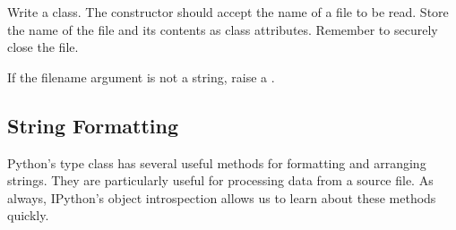 \begin{problem}
Write a  class.
The constructor should accept the name of a file to be read.
Store the name of the file and its contents as class attributes.
Remember to securely close the file.

If the filename argument is not a string, raise a .
\end{problem}

\subsection*{String Formatting}




Python's  type class has several useful methods for formatting and arranging strings.
They are particularly useful for processing data from a source file.
As always, IPython's object introspection allows us to learn about these methods quickly.

